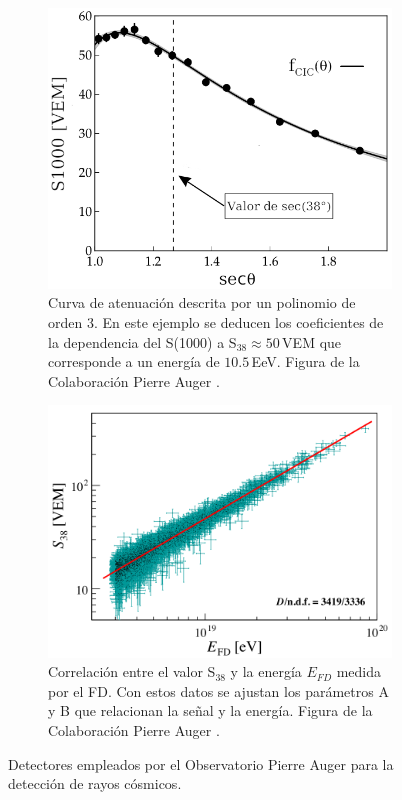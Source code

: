 \begin{figure}[H]
	\centering
	\begin{subfigure}[t]{0.46\textwidth}
		\includegraphics[width=\textwidth]{s1000_theta.png}
		\caption{Curva de atenuación descrita por un polinomio de orden 3. En este ejemplo se deducen los coeficientes de la dependencia del S(1000) a S$_{38}\approx 50\,$VEM que corresponde a un energía de $10.5\,$EeV. Figura de la Colaboración Pierre Auger \cite{como_funciona_auger}.} 	\label{fig:s1000_theta}    \end{subfigure}%
    \hspace{\fill}
    \begin{subfigure}[t]{0.51\textwidth}
		\includegraphics[width=\textwidth]{efd_s38_v2.jpg}
		\caption{Correlación entre el valor S$_{38}$ y la energía $E_{FD}$ medida por el FD. Con estos datos se ajustan los parámetros A y B que relacionan la señal y la energía.  Figura de la Colaboración Pierre Auger \cite{tobepublished}.} 	\label{fig:efd_s38}
    \end{subfigure}%
    \caption{Detectores empleados por el Observatorio Pierre Auger para la detección de rayos cósmicos.}
\end{figure}


